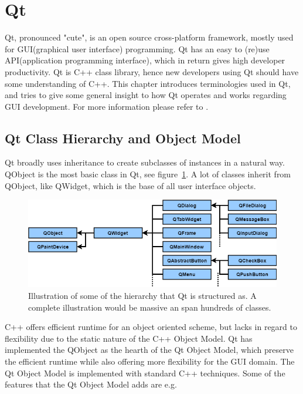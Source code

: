 \section{Qt}
\label{sec:qt}
Qt, pronounced "cute", is an open source cross-platform framework, mostly used for GUI(graphical user interface) programming. Qt has an easy to (re)use API(application programming interface), which in return gives high developer productivity. Qt is C++ class library, hence new developers using Qt should have some understanding of C++.
This chapter introduces terminologies used in Qt, and tries to give some general insight to how Qt operates and works regarding GUI development. For more information please refer to \cite{QtDocumentation}.




\subsection{Qt Class Hierarchy and Object Model}
\label{sec:QtClassHierarchyAndObjectModel}
Qt broadly uses inheritance to create subclasses of instances in a natural way. QObject is the most basic class in Qt, see figure~\ref{fig:QtHeirachy}. A lot of classes inherit from QObject, like QWidget, which is the base of all user interface objects. 

\begin{figure}[h]
	\centering
	\includegraphics[scale=0.55]{Figures/QtHierachy.png}
	\caption{Illustration of some of the hierarchy that Qt is structured as. A complete illustration would be massive an span hundreds of classes.}
	\label{fig:QtHeirachy}
\end{figure}

C++ offers efficient runtime for an object oriented scheme, but lacks in regard to flexibility due to the static nature of the C++ Object Model. Qt has implemented the QObject as the hearth of the Qt Object Model, which preserve the efficient runtime while also offering more flexibility for the GUI domain. The Qt Object Model is implemented with standard C++ techniques. Some of the features that the Qt Object Model adds are e.g.

